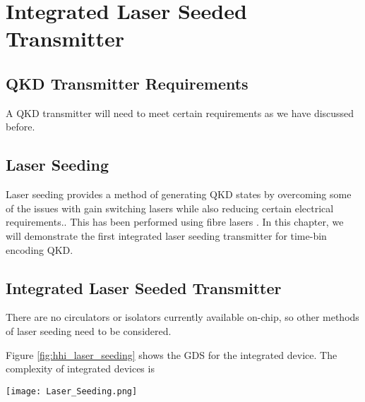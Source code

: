 %
%
\graphicspath{{./chapters/chapter06/fig06/}}

\let\textcircled=\pgftextcircled
\chapter{Integrated Laser Seeded Transmitter}
\label{chap:laser-seeding}

\section{QKD Transmitter Requirements}
\label{sec:sec06}

A \ac{QKD} transmitter will need to meet certain requirements as we have discussed before.

\section{Laser Seeding}

Laser seeding provides a method of generating \ac{QKD} states by overcoming some of the issues with gain switching lasers while also reducing certain electrical requirements.. This has been performed using fibre lasers \cite{}. In this chapter, we will demonstrate the first integrated laser seeding transmitter for time-bin encoding \ac{QKD}. 

\section{Integrated Laser Seeded Transmitter}

There are no circulators or isolators currently available on-chip, so other methods of laser seeding need to be considered.

Figure \ref{fig:hhi_laser_seeding} shows the GDS for the integrated device. The complexity of integrated devices is 

\begin{sidewaysfigure}
	\texttt{[image: Laser\_Seeding.png]}
	\caption[InP laser seeding transmitter with QRNG]{This shows the layout of the laser seeded transmitter device fabricated by HHI. The chip measures \SI[product-units=power]{6x4}{mm} and contains two laser seeding prototype circuits, a homodyne \ac{qrng} and test structure to measure laser and waveguide performances. This demonstrates the complexity and compactness possible in the integrated platform.}
	\label{fig:hhi_laser_seeding}
\end{sidewaysfigure}

